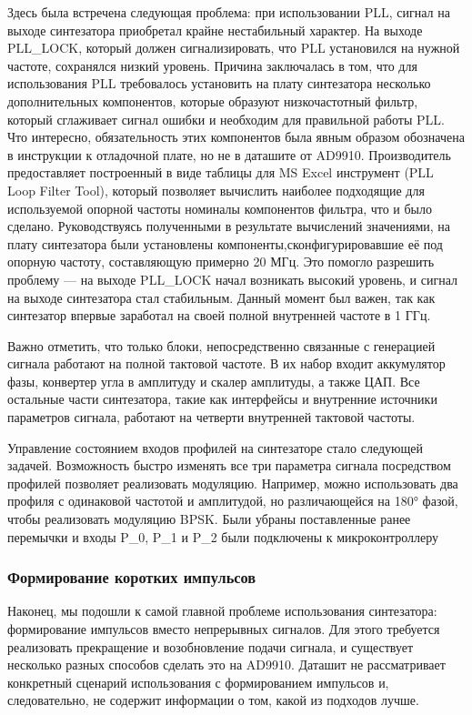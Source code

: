\documentclass[rusmathsym, eqnumwithinsec, amspack, hyperref]{bomgost}
\begin{document}
Здесь была встречена следующая проблема: при использовании PLL, сигнал на выходе синтезатора приобретал крайне нестабильный характер. На выходе PLL\_LOCK, который должен сигнализировать, что PLL установился на нужной частоте, сохранялся низкий уровень. Причина заключалась в том, что для использования PLL требовалось установить на плату синтезатора несколько дополнительных компонентов, которые образуют низкочастотный фильтр, который сглаживает сигнал ошибки и необходим для правильной работы PLL. Что интересно, обязательность этих компонентов была явным образом обозначена в инструкции к отладочной плате, но не в даташите от AD9910. Производитель предоставляет построенный в виде таблицы для MS Excel инструмент (PLL Loop Filter Tool), который позволяет вычислить наиболее подходящие для используемой опорной частоты номиналы компонентов фильтра, что и было сделано. Руководствуясь полученными в результате вычислений значениями, на плату синтезатора были установлены компоненты,сконфигурировавшие её под опорную частоту, составляющую примерно 20 МГц. Это помогло разрешить проблему --- на выходе PLL\_LOCK начал возникать высокий уровень, и сигнал на выходе синтезатора стал стабильным. Данный момент был важен, так как синтезатор впервые заработал на своей полной внутренней частоте в 1 ГГц.

Важно отметить, что только блоки, непосредственно связанные с генерацией сигнала работают на полной тактовой частоте. В их набор входит аккумулятор фазы, конвертер угла в амплитуду и скалер амплитуды, а также ЦАП. Все остальные части синтезатора, такие как интерфейсы и внутренние источники параметров сигнала, работают на четверти внутренней тактовой частоты.

Управление состоянием входов профилей на синтезаторе стало следующей задачей. Возможность быстро изменять все три параметра сигнала посредством профилей позволяет реализовать модуляцию. Например, можно использовать два профиля с одинаковой частотой и амплитудой, но различающейся на 180° фазой, чтобы реализовать модуляцию BPSK. Были убраны поставленные ранее перемычки и входы P\_0, P\_1 и P\_2 были подключены к микроконтроллеру

\subsubsection{Формирование коротких импульсов}

Наконец, мы подошли к самой главной проблеме использования синтезатора: формирование импульсов вместо непрерывных сигналов. Для этого требуется реализовать прекращение и возобновление подачи сигнала, и существует несколько разных способов сделать это на AD9910. Даташит не рассматривает конкретный сценарий использования с формированием импульсов и, следовательно, не содержит информации о том, какой из подходов лучше.
\end{document}
